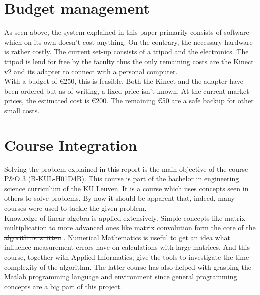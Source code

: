 \documentclass{article}
\providecommand{\DIFaddtex}[1]{{\protect\color{blue}\uwave{#1}}} %
\providecommand{\DIFdeltex}[1]{{\protect\color{red}\sout{#1}}}                      %
\providecommand{\DIFaddbegin}{} %
\providecommand{\DIFaddend}{} %
\providecommand{\DIFdelbegin}{} %
\providecommand{\DIFdelend}{} %
\providecommand{\DIFadd}[1]{\texorpdfstring{\DIFaddtex{#1}}{#1}} %
\providecommand{\DIFdel}[1]{\texorpdfstring{\DIFdeltex{#1}}{}} %
\newcommand{\DIFscaledelfig}{0.5}
\newlength{\DIFdelgraphicswidth} %
\newlength{\DIFdelgraphicsheight} %
\newcommand{\DIFaddincludegraphics}[2][]{{\color{blue}\fbox{\DIFOincludegraphics[#1]{#2}}}} %
\newcommand{\DIFdelincludegraphics}[2][]{%
\sbox{\DIFdelgraphicsbox}{\DIFOincludegraphics[#1]{#2}}%
\settoboxwidth{\DIFdelgraphicswidth}{\DIFdelgraphicsbox} %
\settoboxtotalheight{\DIFdelgraphicsheight}{\DIFdelgraphicsbox} %
\scalebox{\DIFscaledelfig}{%
\parbox[b]{\DIFdelgraphicswidth}{\usebox{\DIFdelgraphicsbox}\\[-\baselineskip] \rule{\DIFdelgraphicswidth}{0em}}\llap{\resizebox{\DIFdelgraphicswidth}{\DIFdelgraphicsheight}{%
\setlength{\unitlength}{\DIFdelgraphicswidth}%
\begin{picture}(1,1)%
\thicklines\linethickness{2pt} %
{\color[rgb]{1,0,0}\put(0,0){\framebox(1,1){}}}%
{\color[rgb]{1,0,0}\put(0,0){\line( 1,1){1}}}%
{\color[rgb]{1,0,0}\put(0,1){\line(1,-1){1}}}%
\end{picture}%
}\hspace*{3pt}}} %
} %
\DeclareRobustCommand{\DIFaddbegin}{\DIFOaddbegin \let\includegraphics\DIFaddincludegraphics} %
\DeclareRobustCommand{\DIFaddend}{\DIFOaddend \let\includegraphics\DIFOincludegraphics} %
\DeclareRobustCommand{\DIFdelbegin}{\DIFOdelbegin \let\includegraphics\DIFdelincludegraphics} %
\DeclareRobustCommand{\DIFdelend}{\DIFOaddend \let\includegraphics\DIFOincludegraphics} %
\begin{document}
\section{Budget management}
As seen above, the system explained in this paper primarily consists of software which on its own doesn't cost anything. On the contrary, the necessary hardware is rather costly. The current set-up consists of a tripod and the electronics. The tripod is lend for free by the faculty thus the only remaining costs are the Kinect v2 and its adapter to connect with a personal computer.\\
With a budget of \euro 250, this is feasible. Both the Kinect and the adapter have been ordered but as of writing, a fixed price isn't known. At the current market prices, the estimated cost is \euro 200. The remaining \euro 50 are a safe backup for other small costs.

\section{Course Integration}
Solving the problem explained in this report is the main objective of the course P\&O 3 (B-KUL-H01D4B). This course is part of the bachelor in engineering science curriculum of the KU Leuven. It is a course which uses concepts seen in others to solve problems. By now it should be apparent that, indeed, many courses were used to tackle the given problem.\\
Knowledge of linear algebra is applied extensively. Simple concepts like matrix multiplication to more advanced ones like matrix convolution form the core of the \DIFdelbegin \DIFdel{algorithms written }\DIFdelend \DIFaddbegin \DIFadd{written algorithms}\DIFaddend . Numerical Mathematics is useful to get an idea what influence measurement errors have on calculations with large matrices. And this course, together with Applied Informatics, give the tools to investigate the time complexity of the algorithm. The latter course has also helped with grasping the Matlab programming language and environment since general programming concepts are a big part of this project.
\end{document}
